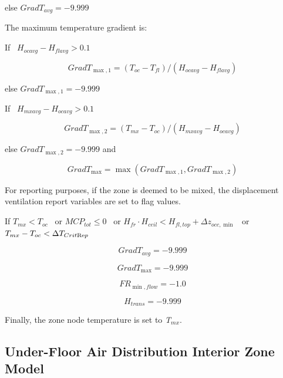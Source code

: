 else \(Grad{T_{avg}} =  - 9.999\)

The maximum temperature gradient is:

If~ \({H_{ocavg}} - {H_{flavg}} > 0.1\)

\begin{equation}
Grad{T_{\max ,1}} = ({T_{oc}} - {T_{fl}})/({H_{ocavg}} - {H_{flavg}})
\end{equation}

else \(Grad{T_{\max ,1}} = - 9.999\)

If~ \({H_{mxavg}} - {H_{ocavg}} > 0.1\)

\begin{equation}
Grad{T_{\max ,2}} = ({T_{mx}} - {T_{oc}})/({H_{mxavg}} - {H_{ocavg}})
\end{equation}

else \(Grad{T_{\max ,2}} = - 9.999\) and

\begin{equation}
Grad{T_{\max }} = \max (Grad{T_{\max ,1}},Grad{T_{\max ,2}})
\end{equation}

For reporting purposes, if the zone is deemed to be mixed, the displacement ventilation report variables are set to flag values.

If \({T_{mx}} < {T_{oc}}\) ~or \(MC{P_{tot}} \le 0\) ~or \({H_{fr}} \cdot {H_{ceil}} < {H_{fl,top}} + \Delta {z_{occ,\min }}\) ~or \({T_{mx}} - {T_{oc}} < \Delta {T_{Crit{\mathop{\rm Re}\nolimits} p}}\)

\begin{equation}
Grad{T_{avg}} =  - 9.999
\end{equation}

\begin{equation}
Grad{T_{\max }} =  - 9.999
\end{equation}

\begin{equation}
F{R_{\min ,flow}} =  - 1.0
\end{equation}

\begin{equation}
{H_{trans}} =  - 9.999
\end{equation}

Finally, the zone node temperature is set to \emph{T\(_{mx}\)}.

\subsection{Under-Floor Air Distribution Interior Zone Model}\label{under-floor-air-distribution-interior-zone-model}


